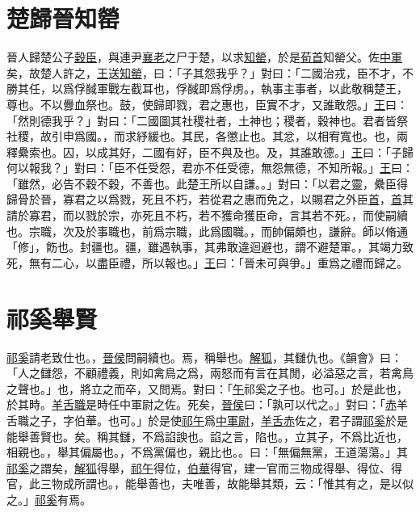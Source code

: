 \documentclass{article}
\newcommand{\tsu}{\small\kaishu\color{brown}}
\begin{document}
\section{楚歸晉知罃}

\noindent{\tsu 成公三年}

晉人歸楚公子\uline{穀臣}，與連尹\uline{襄老}之尸于楚，以求\uline{知罃}，於是\uline{荀首}{\tsu 知罃父。}佐\uline{中軍}矣，故楚人許之，\uline{王}送\uline{知罃}，曰：「子其怨我乎？」對曰：「二國治戎，臣不才，不勝其任，以爲俘馘{\tsu 軍戰左截耳也，俘馘即爲俘虏。}，執事{\tsu 主事者，以此敬稱楚王，尊也。}不以釁{\tsu 血祭也。}鼓，使歸即戮，君之惠也，臣實不才，又誰敢怨。」\uline{王}曰：「然則德我乎？」對曰：「二國圖其社稷{\tsu 社者，土神也；稷者，穀神也。君者皆祭社稷，故引申爲國。}，而求紓{\tsu 緩也。}其民，各懲{\tsu 止也。}其忿，以相宥{\tsu 寬也。}也，兩釋纍{\tsu 索也。}囚，以成其好，二國有好，臣不與{\tsu 及也。}及，其誰敢德。」\uline{王}曰：「子歸何以報我？」對曰：「臣不任受怨，君亦不任受德，無怨無德，不知所報。」\uline{王}曰：「雖然，必告不穀{\tsu 不穀，不善也。此楚王所以自謙。}。」對曰：「以君之靈，纍臣得歸骨於晉，寡君之以爲戮，死且不朽，若從君之惠而免之，以賜君之外臣\uline{首}，\uline{首}其請於寡君，而以戮於宗，亦死且不朽，若不獲命{\tsu 獲臣命，言其若不死。}，而使嗣{\tsu 續也。}宗職，次及於事{\tsu 職也，前爲宗職，此爲國職。}，而帥偏{\tsu 頗也，謙辭。}師以脩{\tsu 通「修」，飭也。}封{\tsu 疆也。}疆，雖遇執事，其弗敢違{\tsu 迴避也，謂不避楚軍。}，其竭力致死，無有二心，以盡臣禮，所以報也。」\uline{王}曰：「晉未可與爭。」重爲之禮而歸之。

\section{祁奚舉賢}

\noindent{\tsu 襄公三年}

\uline{祁奚}請老{\tsu 致仕也。}，\uline{晉侯}問嗣{\tsu 續也。}焉，稱{\tsu 舉也。}\uline{解狐}，其讎{\tsu 仇也。《韻會》曰：「人之讎怨，不顧禮義，則如禽鳥之爲，兩怒而有言在其閒，必溢惡之言，若禽鳥之聲也。」}也，將立之而卒，又問焉。對曰：「\uline{午}{\tsu 祁奚之子也。}也可。」於是{\tsu 此也，於其時。}\uline{羊舌職}{\tsu 是時任中軍尉之佐。}死矣，\uline{晉侯}曰：「孰可以代之。」對曰：「\uline{赤}{\tsu 羊舌職之子，字伯華。}也可。」於是使\uline{祁午}爲\uline{中軍尉}，\uline{羊舌赤}佐之，君子謂\uline{祁奚}於是能舉善{\tsu 賢也。}矣。稱其讎，不爲諂{\tsu 諛也。諂之言，陷也。}，立其子，不爲比{\tsu 近也，相親也。}，舉其偏{\tsu 屬也。}，不爲黨{\tsu 偏也，親比也。}。曰：「無偏無黨，王道蕩蕩。」其\uline{祁奚}之謂矣，\uline{解狐}得舉，\uline{祁午}得位，\uline{伯華}得官，建一官而三物成{\tsu 得舉、得位、得官，此三物成所謂也。}，能舉善也，夫唯善，故能舉其類，云：「惟其有之，是以似之。」\uline{祁奚}有焉。
\end{document}
